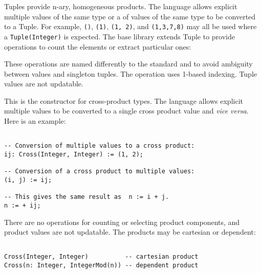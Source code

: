 %
%
%
Tuples provide n-ary, homogeneous products.  
The language allows explicit multiple values of the same type or
a  of values of the same type to be converted to a Tuple.
For example,
\verb"()", \verb"(1)", \verb"(1, 2)", and \verb"(1,3,7,8)" may all be
used where a \verb"Tuple(Integer)" is expected.
The base \asharp{} library extends Tuple
to provide operations to count the elements or extract particular ones:

%
%
These operations are named differently to the standard
\ttin{\#} and  to avoid ambiguity between 
values and singleton tuples.
The  operation uses 1-based indexing.
Tuple values are not updatable.

%
This is the constructor for cross-product types.
The language allows explicit multiple values to be converted
to a single cross product value and {\em vice versa}.
Here is an example:

\begin{small}%
\begin{verbatim}

-- Conversion of multiple values to a cross product:
ij: Cross(Integer, Integer) := (1, 2);

-- Conversion of a cross product to multiple values:
(i, j) := ij;

-- This gives the same result as  n := i + j.
n := + ij;
\end{verbatim}
\end{small}

There are no operations for counting or selecting product components,
and product values are not updatable.
The products may be cartesian or dependent:

\begin{small}
\begin{verbatim}

Cross(Integer, Integer)          -- cartesian product
Cross(n: Integer, IntegerMod(n)) -- dependent product
\end{verbatim}
\end{small}


